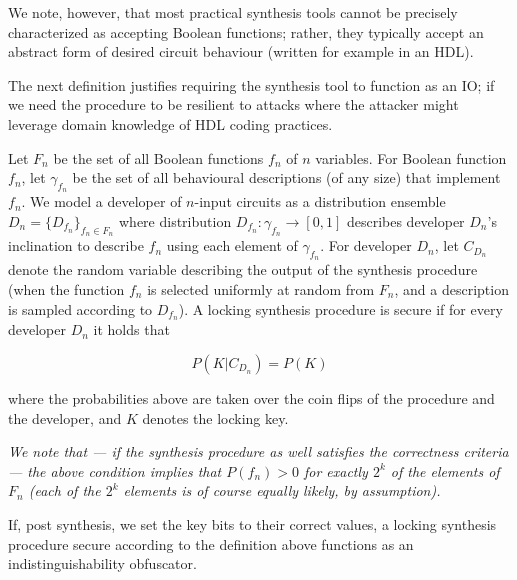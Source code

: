  We note, however, that most practical synthesis tools cannot be precisely characterized as accepting Boolean functions; rather, they typically accept an abstract form of desired circuit behaviour (written for example in an HDL). 
 
 The next definition justifies requiring the synthesis tool to function as an IO; if we need the procedure to be resilient to attacks where the attacker might leverage domain knowledge of HDL coding practices.

\begin{definition} Let $F_n$ be the set of all Boolean functions $f_n$ of $n$ variables. For Boolean function $f_n$, let $\gamma_{f_n}$ be the set of all behavioural descriptions (of any size) that implement $f_n$. We model a developer of $n$-input circuits as a distribution ensemble $D_n=\{D_{f_n}\}_{f_n\in F_n}$ where distribution $D_{f_n}:\gamma_{f_n}\rightarrow [0,1]$ describes developer $D_n$'s inclination to describe $f_n$ using each element of $\gamma_{f_n}$. For developer $D_n$, let $C_{D_n}$ denote the random variable describing the output of the synthesis procedure (when the function $f_n$ is selected uniformly at random from $F_n$, and a description is sampled according to $D_{f_n}$). A locking synthesis procedure is secure if for every developer $D_n$ it holds that

$$ P(K|C_{D_n})=P(K) $$

where the probabilities above are taken over the coin flips of the procedure and the developer, and $K$ denotes the locking key.
\end{definition}

\emph{We note that --- if the synthesis procedure as well satisfies the correctness criteria --- the above condition implies that $P(f_n)>0$ for exactly $2^k$ of the elements of $F_n$ (each of the $2^k$ elements is of course equally likely, by assumption).}


\begin{proposition}
If, post synthesis, we set the key bits to their correct values, a locking synthesis procedure secure according to the definition above functions as an indistinguishability obfuscator.
\end{proposition}


